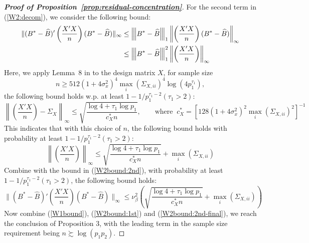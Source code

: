 \begin{proof}[\textbf{Proof of Proposition~\ref{prop:residual-concentration}}]
For the second term in (\ref{W2:decom}), we consider the following bound:
\begin{equation} \label{W2bound:2nd}
\begin{split}
\|(B^*-\widehat{B})'\left(\frac{X'X}{n}\right)  (B^*-\widehat{B}) \|_\infty & \leq {\left\vert\kern-0.25ex\left\vert\kern-0.25ex\left\vert B^*-\widehat{B} \right\vert\kern-0.25ex\right\vert\kern-0.25ex\right\vert}_1 \left\|\left(\frac{X'X}{n}\right) (B^*-\widehat{B})\right\|_\infty\\
& \leq  {\left\vert\kern-0.25ex\left\vert\kern-0.25ex\left\vert B^*-\widehat{B} \right\vert\kern-0.25ex\right\vert\kern-0.25ex\right\vert}^2_1   \left\| \left(\frac{X'X}{n}\right) \right\|_\infty
\end{split} 
\end{equation}
Here, we apply Lemma~8 in \citet{ravikumar2011high} to the design matrix $X$, for sample size $$n\geq 512(1+4\sigma_x^2)^4 \max_i(\Sigma_{X,ii})^4\log (4p_1^{\tau_1}),$$ the following bound holds w.p. at least $1-1/p_1^{\tau_1-2}(\tau_1>2)$:
\begin{equation}\label{exp:c_X}
\left\|\left(\frac{X'X}{n}\right) - \Sigma_X\right\|_\infty \leq \sqrt{\frac{\log 4 + \tau_1 \log p_1}{c^{*}_X n}}, \qquad \text{where }~c_X^*=\left[ 128(1+4\sigma_x^2)^2\max\limits_{i}(\Sigma_{X,ii})^2\right]^{-1}
\end{equation}
This indicates that with this choice of $n$, the following bound holds with probability at least $1-1/p_1^{\tau_1-2}(\tau_1>2)$:
\begin{equation*}
\left\| \left(\frac{X'X}{n}\right) \right\|_\infty \leq \sqrt{\frac{\log 4 + \tau_1 \log p_1}{c^*_Xn}} +  \max_i(\Sigma_{X,ii})
\end{equation*}
Combine with the bound in (\ref{W2bound:2nd}), with probability at least $1-1/p_1^{\tau_1-2}(\tau_1>2)$, the following bound holds:
\begin{equation} \label{W2bound:2nd-final}
\|(B^*-\widehat{B})'\left(\frac{X'X}{n}\right)  (B^*-\widehat{B}) \|_\infty  \leq \nu_\beta^2\left( \sqrt{\frac{\log 4 + \tau_1 \log p_1}{c^*_Xn}} +  \max_i(\Sigma_{X,ii})\right)
\end{equation}
Now combine (\ref{W1bound}), (\ref{W2bound:1st}) and (\ref{W2bound:2nd-final}), we reach the conclusion of Proposition 3, with the leading term in the sample size requirement being $n\succsim \log(p_1p_2)$. 
\end{proof}

